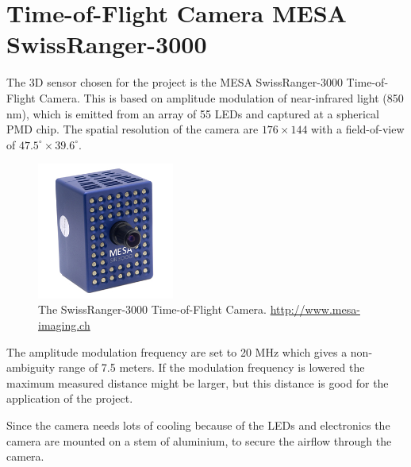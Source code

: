 \section{Time-of-Flight Camera MESA SwissRanger-3000}
The 3D sensor chosen for the project is the MESA SwissRanger-3000 Time-of-Flight Camera.
This is based on amplitude modulation of near-infrared light (850 nm), which is emitted from an
array of 55 LEDs and captured at a spherical PMD chip. The spatial resolution of the camera
are $176\times144$ with a field-of-view of $47.5^\circ \times 39.6^\circ$. 
\begin{figure}[htbp]
    \centering
    \includegraphics[width=0.4\textwidth]{pics/sr3000}
    \caption{The SwissRanger-3000 Time-of-Flight Camera. \url{http://www.mesa-imaging.ch}}
    \label{chap3:fig-sr3000}
\end{figure}
The amplitude modulation frequency are set to 20 MHz which gives a non-ambiguity range of
7.5 meters. If the modulation frequency is lowered the maximum measured distance might be
larger, but this distance is good for the application of the project. 

Since the camera needs lots of cooling because of the LEDs and electronics the camera are
mounted on a stem of aluminium, to secure the airflow through the camera. 

